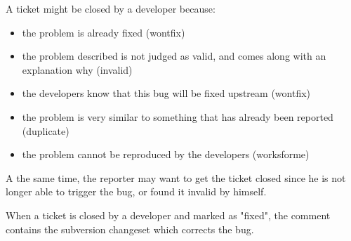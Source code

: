 A ticket might be closed by a developer because:

\begin{itemize}
\item the problem is already fixed (wontfix)
\item the problem described is not judged as valid, and comes along with an explanation why (invalid)
\item the developers know that this bug will be fixed upstream (wontfix)
\item the problem is very similar to something that has already been reported (duplicate)
\item the problem cannot be reproduced by the developers (worksforme)
\end{itemize}

A the same time, the reporter may want to get the ticket closed since he is not 
longer able to trigger the bug, or found it invalid by himself.

When a ticket is closed by a developer and marked as "fixed", the comment contains 
the subversion changeset which corrects the bug.
